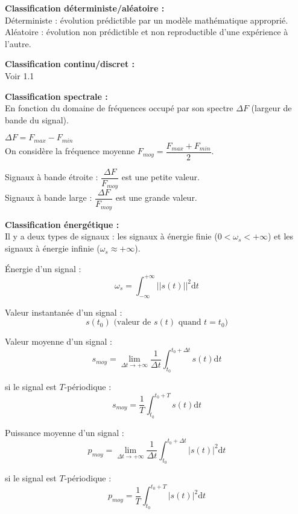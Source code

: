 \documentclass[a4paper,12pt]{article}
\begin{document}
\textbf{Classification déterministe/aléatoire :} \\
Déterministe : évolution prédictible par un modèle mathématique approprié. \\
Aléatoire : évolution non prédictible et non reproductible d'une expérience à l'autre.

\textbf{Classification continu/discret :} \\
Voir 1.1

\textbf{Classification spectrale :} \\
En fonction du domaine de fréquences occupé par son spectre $\Delta F$ (largeur de bande du signal).

$\Delta F = F_{max} - F_{min}$ \\
On considère la fréquence moyenne $F_{moy} = \dfrac{F_{max} + F_{min}}{2}$.

Signaux à bande étroite : $\dfrac{\Delta F}{F_{moy}}$ est une petite valeur. \\
Signaux à bande large : $\dfrac{\Delta F}{F_{moy}}$ est une grande valeur.

\textbf{Classification énergétique :} \\
Il y a deux types de signaux : les signaux à énergie finie ($0 < \omega _{s} < +\infty$) et les signaux à énergie infinie ($\omega _{s} \approx +\infty$).

\begin{defi}
    \'Energie d'un signal :
    \[ \omega _{s} = \int_{-\infty}^{+\infty} ||s(t)||^2 \mathrm{d}t \]

    Valeur instantanée d'un signal :
    \[ s(t_{0}) \text{ (valeur de }s(t) \text{ quand } t=t_{0}\text{)} \]
\end{defi}

\begin{defi}
    Valeur moyenne d'un signal :
    \[ s_{moy} = \lim_{\Delta t \to +\infty} \dfrac{1}{\Delta t} \int_{t_{0}}^{t_{0}+\Delta t} s(t) \mathrm{d}t \]

    si le signal est $T$-périodique :
    \[ s_{moy} = \dfrac{1}{T} \int_{t_{0}}^{t_{0}+T} s(t) \mathrm{d}t \]
\end{defi}

\begin{defi}
    Puissance moyenne d'un signal :
    \[ p_{moy} = \lim_{\Delta t \to +\infty} \dfrac{1}{\Delta t} \int_{t_{0}}^{t_{0}+\Delta t} |s(t)|^{2} \mathrm{d}t \]

    si le signal est $T$-périodique :
    \[ p_{moy} = \dfrac{1}{T} \int_{t_{0}}^{t_{0}+T} |s(t)|^{2} \mathrm{d}t \]
\end{defi}
\end{document}
